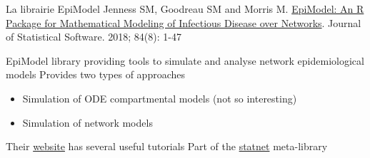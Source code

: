 \documentclass[aspectratio=43]{beamer}
\begin{document}
% 
% 
% 
% 
\begin{frame}{La librairie EpiModel}
Jenness SM, Goodreau SM and Morris M. \href{https://doi.org/10.18637\%2Fjss.v084.i08}{EpiModel: An R Package for Mathematical Modeling of Infectious Disease over Networks}. Journal of Statistical Software. 2018; 84(8): 1-47
\end{frame} 


\begin{frame}{EpiModel}
 library providing tools to simulate and analyse network epidemiological models
\vfill
Provides two types of approaches
\begin{itemize}
\item Simulation of ODE compartmental models (not so interesting)
\item Simulation of network models
\end{itemize}
\vfill
Their \href{https://www.epimodel.org}{website} has several useful tutorials
\vfill
Part of the \href{http://statnet.org/}{statnet} meta-library
\end{frame}
\end{document}
